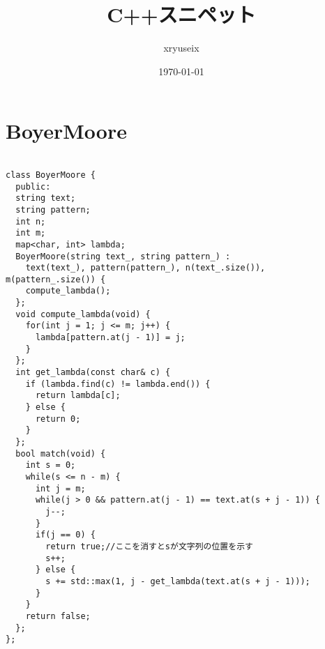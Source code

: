 \documentclass[a4j,titlepage]{jarticle} %
\title{C++スニペット}
\author{xryuseix}
\date{\today}
\begin{document}
\maketitle

\tableofcontents%
\clearpage



\color{white}
\section{BoyerMoore}
\color{black}
\begin{lstlisting}[caption=BoyerMoore]

class BoyerMoore {
  public:
  string text;
  string pattern;
  int n;
  int m;
  map<char, int> lambda;
  BoyerMoore(string text_, string pattern_) : 
    text(text_), pattern(pattern_), n(text_.size()), m(pattern_.size()) {
    compute_lambda();
  };
  void compute_lambda(void) {
    for(int j = 1; j <= m; j++) {
      lambda[pattern.at(j - 1)] = j;
    }
  };
  int get_lambda(const char& c) {
    if (lambda.find(c) != lambda.end()) {
      return lambda[c];
    } else {
      return 0;
    }
  };
  bool match(void) {
    int s = 0;
    while(s <= n - m) {
      int j = m;
      while(j > 0 && pattern.at(j - 1) == text.at(s + j - 1)) {
        j--;
      }
      if(j == 0) {
        return true;//ここを消すとsが文字列の位置を示す
        s++;
      } else {
        s += std::max(1, j - get_lambda(text.at(s + j - 1)));
      }
    }
    return false;
  };
};

\end{lstlisting}

\color{white}
\end{document}
